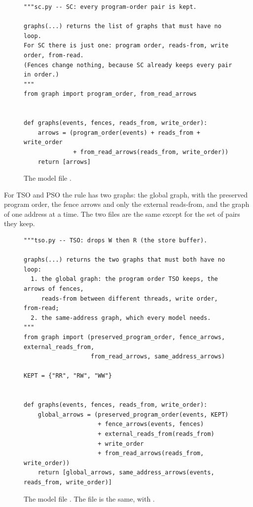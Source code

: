 \begin{figure}[!htbp]
\centering
\begin{lstlisting}[style=vspython]
"""sc.py -- SC: every program-order pair is kept.

graphs(...) returns the list of graphs that must have no loop.
For SC there is just one: program order, reads-from, write order, from-read.
(Fences change nothing, because SC already keeps every pair in order.)
"""
from graph import program_order, from_read_arrows


def graphs(events, fences, reads_from, write_order):
    arrows = (program_order(events) + reads_from + write_order
              + from_read_arrows(reads_from, write_order))
    return [arrows]
\end{lstlisting}
\caption{The model file .}
\label{fig:sccode}
\end{figure}

For TSO and PSO the rule has two graphs: the global graph, with the preserved program order, the fence arrows and only the external reads-from, and the graph of one address at a time. The two files are the same except for the set of pairs they keep.

\begin{figure}[!htbp]
\centering
\begin{lstlisting}[style=vspython]
"""tso.py -- TSO: drops W then R (the store buffer).

graphs(...) returns the two graphs that must both have no loop:
  1. the global graph: the program order TSO keeps, the arrows of fences,
     reads-from between different threads, write order, from-read;
  2. the same-address graph, which every model needs.
"""
from graph import (preserved_program_order, fence_arrows, external_reads_from,
                   from_read_arrows, same_address_arrows)

KEPT = {"RR", "RW", "WW"}


def graphs(events, fences, reads_from, write_order):
    global_arrows = (preserved_program_order(events, KEPT)
                     + fence_arrows(events, fences)
                     + external_reads_from(reads_from)
                     + write_order
                     + from_read_arrows(reads_from, write_order))
    return [global_arrows, same_address_arrows(events, reads_from, write_order)]
\end{lstlisting}
\caption{The model file . The file  is the same, with .}
\label{fig:tsocode}
\end{figure}


